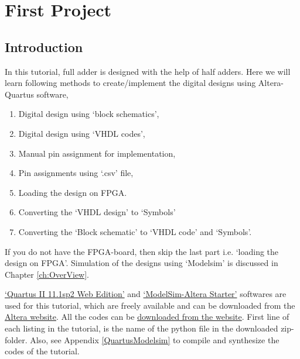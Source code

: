 \chapter{First Project} \label{ch:FirstProject}

\graphicspath{{Chapters/FirstProject/Figures/}}


%

\section{Introduction}
In this tutorial, full adder is designed with the help of half adders. Here we will learn following methods to create/implement the digital designs using Altera-Quartus software, 

\begin{enumerate}
	\item Digital design using `block schematics',
	\item Digital design using `VHDL codes',
	\item Manual pin assignment for implementation,
	\item Pin assignments using `.csv' file,
	\item Loading the design on FPGA. 
	\item Converting the `VHDL design' to `Symbols'
	\item Converting the `Block schematic' to `VHDL code' and `Symbols'. 
\end{enumerate}

If you do not have the FPGA-board, then skip the last part i.e. `loading the design on FPGA'. Simulation of the designs using `Modelsim' is discussed in Chapter \ref{ch:OverView}. 

\href{https://www.altera.com/downloads/software/quartus-ii-we/111sp2.html}{`Quartus II 11.1sp2 Web Edition'} and \href{https://www.altera.com/downloads/software/modelsim-starter/111.html}{`ModelSim-Altera Starter'} softwares are used for this tutorial, which are freely available and can be downloaded from the \href{https://www.altera.com/downloads/download-center.html}{Altera website}. All the codes can be \href{http://pythondsp.readthedocs.io/en/latest/pythondsp/toc.html}{downloaded from the website}. First line of each listing in the tutorial, is the name of the python file in the downloaded zip-folder. Also, see Appendix \ref{QuartusModelsim} to compile and synthesize the codes of the tutorial.

